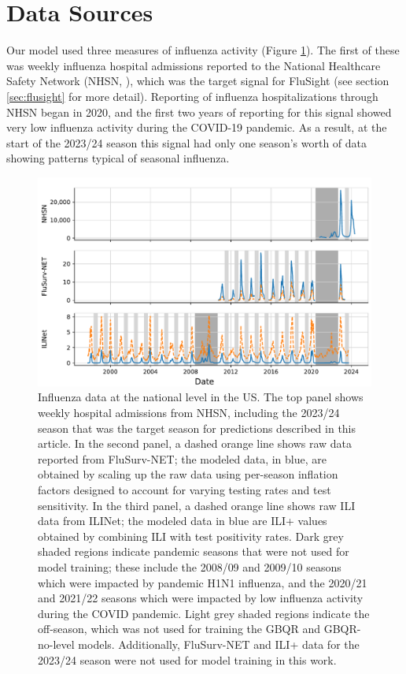 \documentclass{article}\usepackage[]{graphicx}\usepackage[]{xcolor}
\begin{document}
\section{Data Sources}
\label{sec:data}

Our model used three measures of influenza activity (Figure \ref{fig:data_overview}). The first of these was weekly influenza hospital admissions reported to the National Healthcare Safety Network (NHSN, \cite{cdc_flusurveillance_overview}), which was the target signal for FluSight (see section \ref{sec:flusight} for more detail). Reporting of influenza hospitalizations through NHSN began in 2020, and the first two years of reporting for this signal showed very low influenza activity during the COVID-19 pandemic. As a result, at the start of the 2023/24 season this signal had only one season's worth of data showing patterns typical of seasonal influenza.

\begin{figure}[!ht]
    \centering
    \includegraphics[width=\textwidth]{../artifacts/figures/data_overview.pdf}
    \caption{Influenza data at the national level in the US. The top panel shows weekly hospital admissions from NHSN, including the 2023/24 season that was the target season for predictions described in this article. In the second panel, a dashed orange line shows raw data reported from FluSurv-NET; the modeled data, in blue, are obtained by scaling up the raw data using per-season inflation factors designed to account for varying testing rates and test sensitivity.  In the third panel, a dashed orange line shows raw ILI data from ILINet; the modeled data in blue are ILI+ values obtained by combining ILI with test positivity rates. Dark grey shaded regions indicate pandemic seasons that were not used for model training; these include the 2008/09 and 2009/10 seasons which were impacted by pandemic H1N1 influenza, and the 2020/21 and 2021/22 seasons which were impacted by low influenza activity during the COVID pandemic. Light grey shaded regions indicate the off-season, which was not used for training the GBQR and GBQR-no-level models.  Additionally, FluSurv-NET and ILI+ data for the 2023/24 season were not used for model training in this work.}
    \label{fig:data_overview}
\end{figure}
\end{document}
